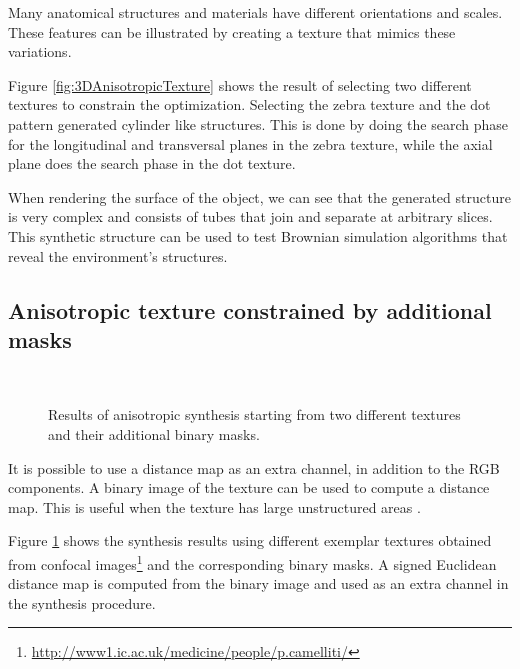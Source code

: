 Many anatomical structures and materials 
have different orientations and scales. 
These features can be illustrated by creating a texture that mimics these variations. 

Figure \ref{fig:3DAnisotropicTexture} shows the result of selecting two different textures 
to constrain the optimization.
Selecting the zebra texture and the dot pattern generated cylinder like structures. 
This is done by doing the search phase for the longitudinal and transversal planes in the zebra texture, 
while the axial plane does the search phase in the dot texture.
 
When rendering the surface of the object, we can see that the generated structure 
is very complex and consists of tubes that join and separate at arbitrary slices.
This synthetic structure can be used to test Brownian simulation algorithms 
that reveal the environment's structures.

\subsection{Anisotropic texture constrained by additional masks }

\begin{figure}[h!]
 \centering 
  \\
 \caption[Anisotropic texture synthesis and distance maps.]{Results of anisotropic synthesis starting from two different textures and their additional binary masks.}
 \label{fig:3DAnisotropicTextureAndMask}
\end{figure}

It is possible to use a distance map as an extra channel, in addition to the RGB components.
A binary image of the texture can be used to compute a distance map.
This is useful when the texture has large unstructured areas \cite{Lefebvre:2006:ATS:1141911.1141921}.

Figure \ref{fig:3DAnisotropicTextureAndMask} shows the synthesis results using different exemplar textures obtained from confocal 
images\footnote{\url{http://www1.ic.ac.uk/medicine/people/p.camelliti/}} and the corresponding binary masks. 
A signed Euclidean distance map is computed from the binary image and used as an extra channel in the synthesis procedure.

